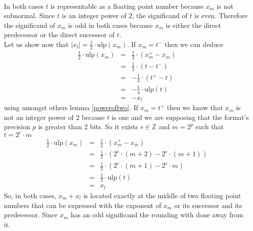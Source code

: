 \documentclass[a4paper,10pt,twoside]{article}
\newenvironment{proof}[1][Proof]{\begin{trivlist}
\item[\hskip \labelsep {\bfseries #1}]}{\end{trivlist}}
\newcommand{\qed}{\nobreak \ifvmode \relax \else \ifdim \lastskip<1.5em \hskip-\lastskip
\hskip1.5em plus0em minus0.5em \fi \nobreak \vrule height0.75em width0.5em depth0.25em\fi}
\newcommand{\Z}{\ensuremath{\mathbb {Z}}}
\newcommand{\mi}{\ensuremath{\mathit{m}}}
\newcommand{\lo}{\ensuremath{\mathit{l}}}
\newcommand{\mUlp}{\ensuremath{\mathrm{ulp}}}
\begin{document}
\begin{proof} ~\\
In both cases $t$ is representable as a floating point number because $x_\mi$ is not subnormal.
Since $t$ is an integer power of $2$, the significand of $t$ is even.
Therefore the significand of $x_\mi$ is odd in both cases because $x_\mi$ is either the direct predecessor or the direct
successor of $t$. \\
Let us show now that $\left \vert x_\lo \right \vert = \frac{1}{2} \cdot \mUlp\left(x_\mi \right)$.
If $x_\mi = t^-$ then we can deduce
\begin{eqnarray*}
\frac{1}{2} \cdot \mUlp\left( x_\mi \right) & = & \frac{1}{2} \cdot \left( x_\mi^+ - x_\mi \right) \\
& = & \frac{1}{2} \cdot \left( t - t^- \right) \\
& = & - \frac{1}{4} \cdot \left( t^+ - t \right) \\
& = & - \frac{1}{4} \cdot \mUlp\left( t \right) \\
& = & - x_\lo
\end{eqnarray*}
using amongst others lemma \ref{poweroftwo}.
If $x_\mi = t^+$ then we know that $x_\mi$ is not an integer power of $2$ because $t$ is one and we are supposing that the
format's precision $p$ is greater than $2$ bits. So it exists $e \in \Z$ and $m = 2^p$ such that $t = 2^e \cdot m$
\begin{eqnarray*}
\frac{1}{2} \cdot \mUlp\left( x_\mi \right) & = & \frac{1}{2} \cdot \left( x_\mi^+ - x_\mi \right) \\
& = & \frac{1}{2} \cdot \left( 2^e \cdot \left( m + 2 \right) - 2^e \cdot \left( m + 1 \right) \right) \\
& = & \frac{1}{2} \cdot \left( 2^e \cdot \left( m + 1 \right) - 2^e \cdot m \right) \\
& = & \frac{1}{2} \cdot \mUlp\left( t \right) \\
& = & x_\lo
\end{eqnarray*}
So, in both cases, $x_\mi + x_\lo$ is located exactly at the middle of two floating point numbers that can be expressed
with the exponent of $x_\mi$ or its successor and its predecessor.
Since $x_\mi$ has an odd significand the rounding with done away from it.\qed
\end{proof}
\end{document}
